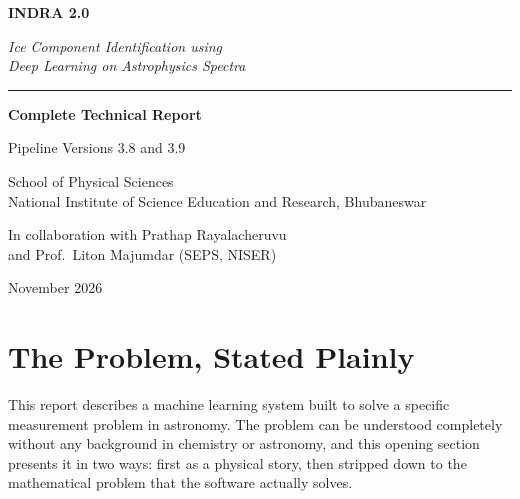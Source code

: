 \documentclass[11pt,a4paper]{article}
\begin{document}
\begin{titlepage}
\centering
\vspace*{3.2cm}

{\color{navy}\Huge\bfseries INDRA 2.0\par}
\vspace{0.7cm}
{\color{navylight}\Large\itshape Ice Component Identification using\\[2pt]
Deep Learning on Astrophysics Spectra\par}

\vspace{1.4cm}
{\color{rulegrey}\rule{0.45\textwidth}{1pt}}
\vspace{1.2cm}

{\Large\bfseries Complete Technical Report\par}
\vspace{0.35cm}
{\large Pipeline Versions 3.8 and 3.9\par}

\vspace{2.2cm}

{\large School of Physical Sciences\\[2pt]
National Institute of Science Education and Research, Bhubaneswar\par}

\vspace{0.9cm}
{\color{greytext}\normalsize In collaboration with Prathap Rayalacheruvu\\
and Prof.\ Liton Majumdar (SEPS, NISER)\par}

\vfill
{\color{greytext}November 2026}
\end{titlepage}

{\small\setlength{\parskip}{0pt}\tableofcontents}
\thispagestyle{fancy}
\newpage

\section{The Problem, Stated Plainly}

This report describes a machine learning system built to solve a specific
measurement problem in astronomy. The problem can be understood completely
without any background in chemistry or astronomy, and this opening section
presents it in two ways: first as a physical story, then stripped down to
the mathematical problem that the software actually solves.
\end{document}
